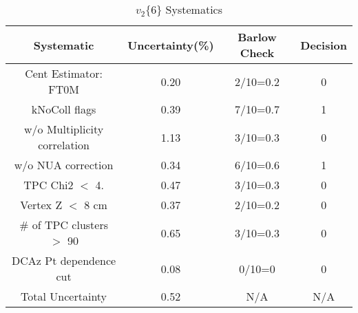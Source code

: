 \begin{table}[htbp]
\caption{$v_2\{6\}$ Systematics}
\label{tab:Sys_v26}
\centering
\begin{tabular}{|c|c|c|c|}
\hline
Systematic & Uncertainty(\%) & Barlow Check & Decision \\
\hline
Cent Estimator: FT0M & 0.20 & 2/10=0.2 & 0 \\
kNoColl flags & 0.39 & 7/10=0.7 & 1 \\
w/o Multiplicity correlation & 1.13 & 3/10=0.3 & 0 \\
w/o NUA correction & 0.34 & 6/10=0.6 & 1 \\
TPC Chi2 $<$ 4. & 0.47 & 3/10=0.3 & 0 \\
Vertex Z $<$ 8 cm & 0.37 & 2/10=0.2 & 0 \\
\# of TPC clusters $>$ 90 & 0.65 & 3/10=0.3 & 0 \\
DCAz Pt dependence cut & 0.08 & 0/10=0 & 0 \\
\hline
Total Uncertainty & 0.52 & N/A & N/A \\
\hline
\end{tabular}
\end{table}
